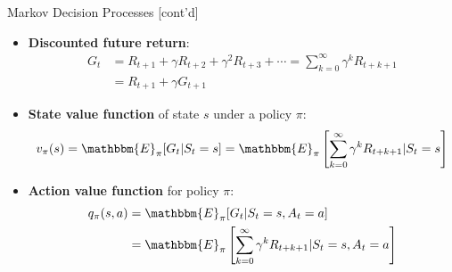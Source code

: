 \documentclass[ignorenonframetext,xcolor=x11names]{beamer}
\begin{document}

\begin{frame}{Markov Decision Processes \small [cont'd]}
\begin{itemize}
   \item \textbf{Discounted future return}:
\begin{align*}
G_t &= R_{t+1} + \gamma R_{t+2} + \gamma^2 R_{t+3} + \cdots = \sum_{k=0}^{\infty} \gamma^k R_{t+k+1} \\
    &= R_{t+1} + \gamma G_{t+1}
\end{align*}
  \item \textbf{State value function} of state $s$ under a policy $\pi$:
\begin{align*}
v_\pi(s) = \mathbbm{E}_\pi [ G_t | S_t = s] = \mathbbm{E}_\pi \left[ \sum_{k=0}^\infty \gamma^k R_{t + k + 1} | S_t = s \right]
\end{align*}
  \item \textbf{Action value function} for policy $\pi$:
\begin{align*}
q_\pi(s, a) &= \mathbbm{E}_\pi [ G_t | S_t = s, A_t = a] \\
&= \mathbbm{E}_\pi \left[ \sum_{k=0}^\infty \gamma^k R_{t + k + 1} | S_t = s, A_t = a \right]
\end{align*}
\end{itemize}
\end{frame}
\end{document}
